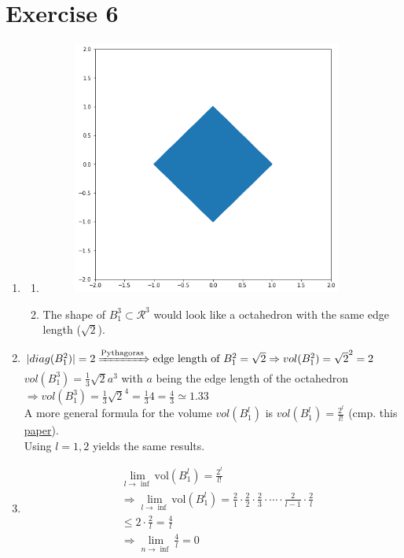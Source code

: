 \documentclass[12pt]{article}
\begin{document}
\section*{Exercise 6}
\begin{enumerate}[label= (\alph*)]
    \item   \begin{enumerate}[label= (\roman*)]
                \item  \begin{figure}[H]
                            \centering
                            \includegraphics[width=3.5in]{unit_ball_plane.png}
                        \end{figure}
                \item The shape of \(B^3_1 \subset \mathcal{R}^3\) would look like a octahedron with the same edge length ($\sqrt{2}$).
            \end{enumerate}
    \item \(|diag(B^2_1)| = 2 \xRightarrow{\text{Pythagoras}} \text{edge length of }B^2_1 = \sqrt{2} \Rightarrow vol(B^2_1) = \sqrt{2}^2 = 2\) \\
        \(vol(B^3_1) = \frac{1}{3}\sqrt{2}a^3\) with $a$ being the edge length of the octahedron \(\Rightarrow vol(B^3_1) = \frac{1}{3}\sqrt{2}^4 = \frac{1}{3}4 = \frac{4}{3} \simeq  1.33\)\\
        A more general formula for the volume \(vol(B^l_1)\) is \(vol(B^l_1) = \frac{2^l}{l!}\) (cmp. this \href{https://doi.org/10.2307/30044198}{paper}).\\
        Using \(l = 1, 2\) yields the same results.
    \item 
        \begin{align*}
            &\lim_{l\rightarrow\inf}{\text{vol}(B^l_1) = \frac{2^l}{l!}}\\
            &\Rightarrow \lim_{l\rightarrow\inf}{\text{vol}(B^l_1)} = \frac{2}{1}\cdot \frac{2}{2}\cdot \frac{2}{3}\cdot \dotsb \cdot\frac{2}{l-1}\cdot \frac{2}{l}\\
            & \leq 2 \cdot \frac{2}{l}  = \frac{4}{l} \\
            &\Rightarrow \lim_{n\rightarrow\inf}{\frac{4}{l}} = 0
        \end{align*}

\end{enumerate}
\end{document}
